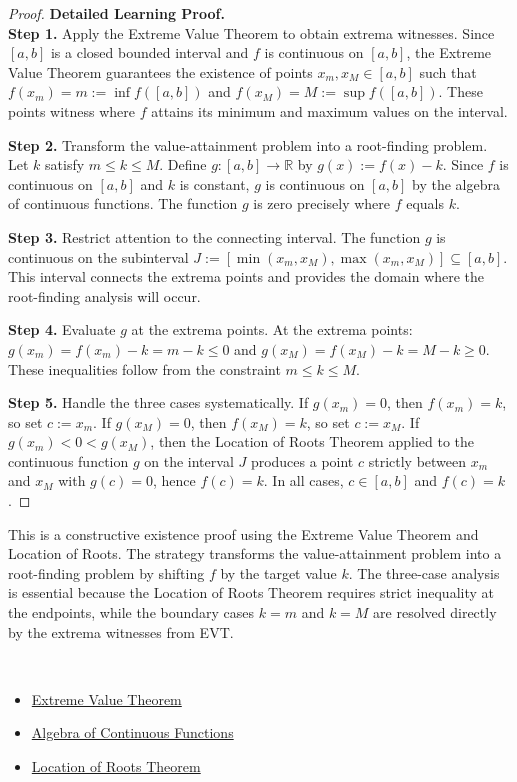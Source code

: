 \begin{proof}
\textbf{Detailed Learning Proof.}~\\

\textbf{Step 1.} Apply the Extreme Value Theorem to obtain extrema witnesses. Since $[a,b]$ is a closed bounded interval and $f$ is continuous on $[a,b]$, the Extreme Value Theorem guarantees the existence of points $x_m, x_M \in [a,b]$ such that $f(x_m) = m := \inf f([a,b])$ and $f(x_M) = M := \sup f([a,b])$. These points witness where $f$ attains its minimum and maximum values on the interval.

\textbf{Step 2.} Transform the value-attainment problem into a root-finding problem. Let $k$ satisfy $m \leq k \leq M$. Define $g : [a,b] \to \mathbb{R}$ by $g(x) := f(x) - k$. Since $f$ is continuous on $[a,b]$ and $k$ is constant, $g$ is continuous on $[a,b]$ by the algebra of continuous functions. The function $g$ is zero precisely where $f$ equals $k$.

\textbf{Step 3.} Restrict attention to the connecting interval. The function $g$ is continuous on the subinterval $J := [\min(x_m, x_M), \max(x_m, x_M)] \subseteq [a,b]$. This interval connects the extrema points and provides the domain where the root-finding analysis will occur.

\textbf{Step 4.} Evaluate $g$ at the extrema points. At the extrema points: $g(x_m) = f(x_m) - k = m - k \leq 0$ and $g(x_M) = f(x_M) - k = M - k \geq 0$. These inequalities follow from the constraint $m \leq k \leq M$.

\textbf{Step 5.} Handle the three cases systematically. If $g(x_m) = 0$, then $f(x_m) = k$, so set $c := x_m$. If $g(x_M) = 0$, then $f(x_M) = k$, so set $c := x_M$. If $g(x_m) < 0 < g(x_M)$, then the Location of Roots Theorem applied to the continuous function $g$ on the interval $J$ produces a point $c$ strictly between $x_m$ and $x_M$ with $g(c) = 0$, hence $f(c) = k$. In all cases, $c \in [a,b]$ and $f(c) = k$.
\end{proof}

\begin{remark*}
This is a constructive existence proof using the Extreme Value Theorem and Location of Roots. The strategy transforms the value-attainment problem into a root-finding problem by shifting $f$ by the target value $k$. The three-case analysis is essential because the Location of Roots Theorem requires strict inequality at the endpoints, while the boundary cases $k = m$ and $k = M$ are resolved directly by the extrema witnesses from EVT.
\end{remark*}

\begin{remark*}[Dependencies]~\\
\begin{itemize}
  \item \hyperref[thm:extreme-value-theorem]{Extreme Value Theorem}
  \item \hyperref[thm:algebra-continuous-functions]{Algebra of Continuous Functions}
  \item \hyperref[thm:location-of-roots]{Location of Roots Theorem}
\end{itemize}
\end{remark*}
